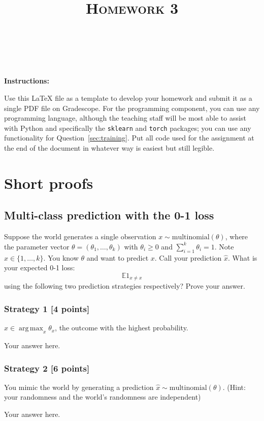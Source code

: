 \documentclass[a4paper]{article}
\title{\textsc{Homework 3}} %
\author{
\red{$>>$NAME HERE$<<$} \\
\red{$>>$ID HERE$<<$}\\
}
\date{}
\theoremstyle{definition}
\DeclareMathOperator*{\argmax}{arg\,max}
\def\E{\mathbb E}
\begin{document}
\maketitle 


\textbf{Instructions:} 

Use this LaTeX file as a template to develop your homework and submit it as a single PDF file on Gradescope. 
For the programming component, you can use any programming language, although the teaching staff will be most able to assist with Python and specifically the {\tt sklearn} and {\tt torch} packages; 
you can use any functionality for Question~\ref{sec:training}.
Put all code used for the assignment at the end of the document in whatever way is easiest but still legible.

\section{Short proofs}

\subsection{Multi-class prediction with the 0-1 loss}

Suppose the world generates a single observation $x \sim \mbox{multinomial}(\theta)$, where the parameter vector $\theta=(\theta_1, \ldots, \theta_k)$ with $\theta_i\ge 0$ and $\sum_{i=1}^k \theta_i=1$.  Note $x \in \{1, \ldots, k\}$.
You know $\theta$ and want to predict $x$. 
Call your prediction $\hat x$.  What is your expected 0-1 loss: 
$$\E 1_{\hat x \neq x}$$
using the following two prediction strategies respectively?  Prove your answer.

\subsubsection{Strategy 1 [4 points]}
$\hat x \in \argmax_x \theta_x$, the outcome with the highest probability.

{\color{blue} Your answer here.}

\subsubsection{Strategy 2 [6 points]}

You mimic the world by generating a prediction $\hat x \sim \mbox{multinomial}(\theta)$.  (Hint: your randomness and the world's randomness are independent)

{\color{blue} Your answer here.}
\end{document}
